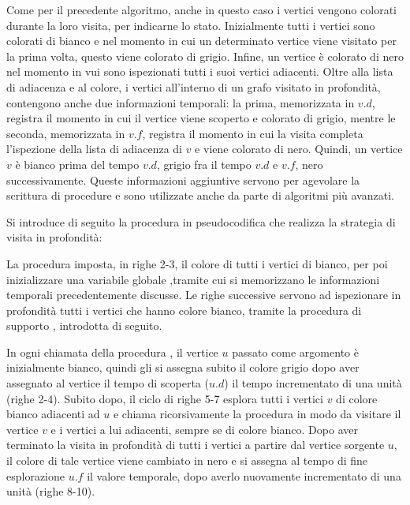 Come per il precedente algoritmo, anche in questo caso i vertici vengono colorati durante la loro visita, per indicarne lo stato. Inizialmente tutti i vertici sono colorati di bianco e nel momento in cui un determinato vertice viene visitato per la prima volta, questo viene colorato di grigio. Infine, un vertice è colorato di nero nel momento in vui sono ispezionati tutti i suoi vertici adiacenti. Oltre alla lista di adiacenza e al colore, i vertici all'interno di un grafo visitato in profondità, contengono anche due informazioni temporali: la prima, memorizzata in \(v.d\), registra il momento in cui il vertice viene scoperto e colorato di grigio, mentre le seconda, memorizzata in \(v.f\), registra il momento in cui la visita completa l'ispezione della lista di adiacenza di \(v\) e viene colorato di nero. Quindi, un vertice \(v\) è bianco prima del tempo \(v.d\), grigio fra il tempo \(v.d\) e \(v.f\), nero successivamente. Queste informazioni aggiuntive servono per agevolare la scrittura di procedure e sono utilizzate anche da parte di algoritmi più avanzati. 

Si introduce di seguito la procedura in pseudocodifica che realizza la strategia di visita in profondità:



La procedura imposta, in righe 2-3, il colore di tutti i vertici di bianco, per poi inizializzare una variabile globale ,tramite cui si memorizzano le informazioni temporali precedentemente discusse. Le righe successive servono ad ispezionare in profondità tutti i vertici che hanno colore bianco, tramite la procedura di supporto , introdotta di seguito.



In ogni chiamata della procedura , il vertice \(u\) passato come argomento è inizialmente bianco, quindi gli si assegna subito il colore grigio dopo aver assegnato al vertice il tempo di scoperta (\(u.d\)) il tempo incrementato di una unità (righe 2-4). Subito dopo, il ciclo  di righe 5-7 esplora tutti i vertici \(v\) di colore bianco adiacenti ad \(u\) e chiama ricorsivamente la procedura in modo da visitare il vertice \(v\) e i vertici a lui adiacenti, sempre se di colore bianco. Dopo aver terminato la visita in profondità di tutti i vertici a partire dal vertice sorgente \(u\), il colore di tale vertice viene cambiato in nero e si assegna al tempo di fine esplorazione \(u.f\) il valore temporale, dopo averlo nuovamente incrementato di una unità (righe 8-10).

